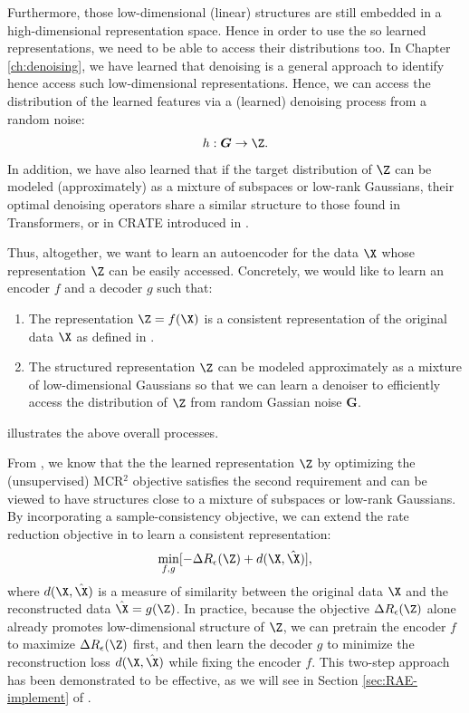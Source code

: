 \documentclass[../../book-main.tex]{subfiles}
\begin{document}
Furthermore, those low-dimensional (linear) structures are still embedded in
a high-dimensional representation space. Hence in order to use the so learned
representations, we need to be able to access their distributions too. In
Chapter \ref{ch:denoising}, we have learned that denoising is a general approach
to identify hence access such low-dimensional representations. Hence, we can  access the distribution of the learned features via a (learned) denoising process from a random noise:
\begin{equation}
    h: \boldsymbol{G} \rightarrow \Z.
\end{equation}
In addition, we have also
learned that if the target distribution of $\Z$ can be modeled (approximately) as
a mixture of subspaces or low-rank Gaussians, their optimal denoising operators
share a similar structure to those found in Transformers, or in CRATE
introduced in . 

Thus, altogether, we want to learn an autoencoder for the data $\X$ whose  representation $\Z$ can be easily accessed. 
Concretely, we would like to learn an encoder $f$ and a decoder $g$ such that:
\begin{enumerate}
  \item The representation $\Z = f(\X)$ is a consistent representation of the original data $\X$ as defined in .
  \item The structured representation $\Z$ can be modeled approximately as a mixture of low-dimensional Gaussians so that we can learn a denoiser to efficiently access the distribution of $\Z$ from random Gassian noise $\boldsymbol{G}$.
\end{enumerate}
 illustrates the above overall processes. 

From , we know that the the learned representation $\Z$ by optimizing the (unsupervised)
MCR$^2$ objective satisfies the second requirement and can be viewed to have structures close to 
a mixture of subspaces or low-rank Gaussians. By incorporating
a sample-consistency objective, we can extend the rate reduction objective in  to learn a consistent representation:
\begin{equation}
  \min_{f, g}
  [ - \Delta R_{\epsilon}(\Z) + d(\X, \hat \X)],
  \label{eqn:autoencode-consistent}
\end{equation}
where $d(\X, \hat \X)$ is a measure of similarity between the original data $\X$
and the reconstructed data $\hat \X = g(\Z)$. In practice, because the objective
$\Delta R_{\epsilon}(\Z)$ alone already promotes low-dimensional structure of
$\Z$, we can pretrain the encoder $f$ to maximize $\Delta R_{\epsilon}(\Z)$
first, and then learn the decoder $g$ to minimize the reconstruction loss $d(\X,
\hat \X)$ while fixing the encoder $f$. This two-step approach has been
demonstrated to be effective, as we will see in Section \ref{sec:RAE-implement} of .
\end{document}
